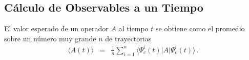 \documentclass[twocolumn,aps,eqsecnum,showkeys,amsmath]{revtex4}
\providecommand{\vxp}[1]{\langle #1 \rangle}
\providecommand{\bra}[1]{\langle #1 \rvert}
\providecommand{\ket}[1]{\lvert #1 \rangle}
\begin{document}

\subsection{C\'alculo de Observables a un Tiempo}
El valor esperado de un operador $A$ al tiempo $t$ se obtiene como el 
promedio sobre un n\'umero muy grande $n$ de trayectorias 
\begin{eqnarray} 	 
\vxp{A (t)} &=& 
	\frac{1}{n} \sum_{i=1}^n \bra{\Psi_c^i (t)} A \ket{\Psi_c^i (t)} \,.
\end{eqnarray}

\end{document}
